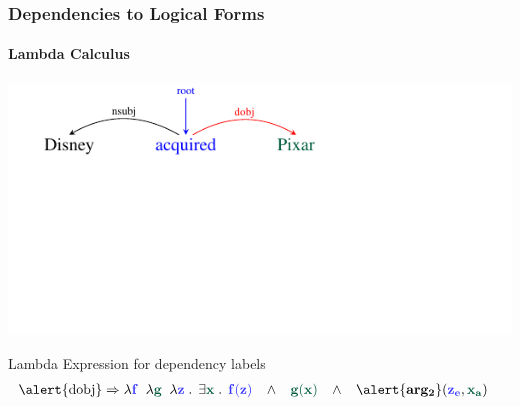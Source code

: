 \documentclass[mathserif,12pt]{beamer}
\newcommand{\hlight}[1]{{\color{blue!80} #1}}
\renewcommand{\land}{\wedge}
\newcommand{\lspace}{.\,}
\begin{document}
\begin{frame}
\frametitle{Dependencies to Logical Forms}
\framesubtitle{Lambda Calculus}
\vspace{-2.4em}
\begin{center}
\includegraphics[trim=2em 9.4em 10em 0em,clip=true,scale=1.3]{figures/pixar_dobj}

\end{center}

\vspace{1cm}

\begin{block}{\centering Lambda Expression for dependency labels}
\vspace{-0.5cm}
\begin{align*}
  \hbox{\alert{dobj}} & \Rightarrow  \lambda \hlight{\mathbf{f}}\;\; \lambda {\color{blue!40!green!60!black} \mathbf{g}}\;\; \lambda \hlight{\mathbf{z}}\; \lspace \; \exists {\color{blue!40!green!60!black} \mathbf{x}}\; \lspace \; \hlight{\mathbf{f(z)}}\;\;\; \land \;\;\; {\color{blue!40!green!60!black} \mathbf{g(x)}}  \;\;\; \land\;\;\; \alert{\mathbf{arg_2}}(\hlight{\mathbf{z_e}}, {\color{blue!40!green!60!black} \mathbf{x_a}})
\end{align*}
\vspace{-0.5cm}
\end{block}
\end{frame}
\end{document}
